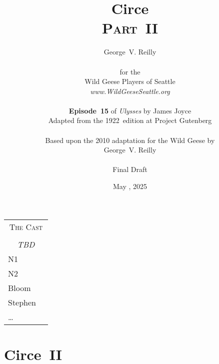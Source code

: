 


\title{\Huge Circe \\
\Large \textsc{Part~II}}
\author{George~V. Reilly\\
\\
{\small for the}\\
Wild Geese Players of Seattle\\
{\textit{www.WildGeeseSeattle.org}}\\
\\
{\small \textbf{Episode~15}
of \textit{Ulysses}
by James Joyce}\\
{\small Adapted from the 1922~edition at Project Gutenberg}
\\
\\
{\small Based upon the 2010 adaptation for the Wild Geese by}\\
{\small George~V. Reilly}
\\
\\
{\small Final Draft}
}
\date{May , 2025}
\raggedbottom



\maketitle
\thispagestyle{empty}
\pagebreak

\begin{tabular}{lp{10cm}}
    \multicolumn{2}{c}{\Large \textsc{The Cast}} \\
\\
    \multicolumn{2}{c}{\large \textit{TBD}} \\
N1 \\
N2 \\
Bloom \\
Stephen \\
\ldots
\end{tabular}

\thispagestyle{empty}

\pagebreak

\setcounter{page}{71}
\setcounter{section}{14}  %


\section*{Circe~II}




